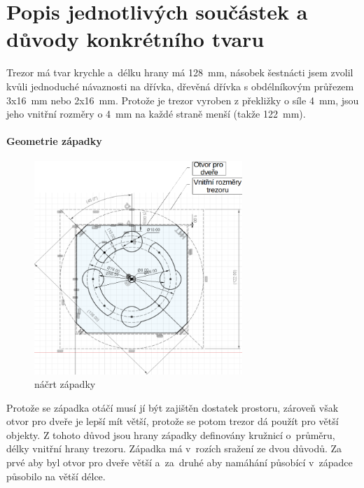 \section{Popis jednotlivých součástek a důvody konkrétního tvaru}

Trezor má tvar krychle a~délku hrany má 128~mm, násobek šestnácti jsem zvolil kvůli jednoduché návaznosti na dřívka, %
dřevěná dřívka s obdélníkovým průřezem 3x16~mm nebo 2x16~mm.
Protože je trezor vyroben z překližky o síle 4~mm, jsou jeho vnitřní rozměry o 4~mm na každé straně menší (takže 122~mm).

\paragraph{Geometrie západky}
\begin{figure}
    \includegraphics[width=0.7\textwidth]{kapitoly/obrazky/M3/geometrie_zapadky.png}
    \caption{náčrt západky} %
    \label{fig:M3-geometrie-zapadky}
\end{figure} %

Protože se západka otáčí musí jí být zajištěn dostatek prostoru, zároveň však otvor pro dveře je lepší mít větší, protože se potom trezor dá použít pro větší objekty.
Z tohoto důvod jsou hrany západky definovány kružnicí o~průměru, délky vnitřní hrany trezoru. Západka má v~rozích sražení ze dvou důvodů. Za prvé aby byl otvor pro
dveře větší a~za~druhé aby namáhání působící v~západce působilo na větší délce.

